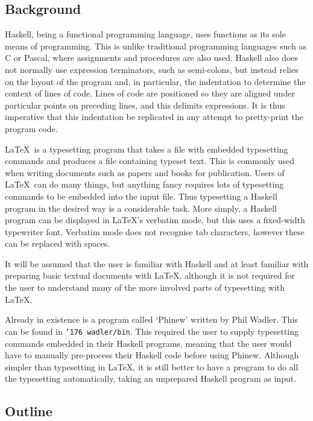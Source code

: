 \subsection*{Background}

Haskell, being a functional programming language, uses functions as its
sole means of programming.  This is unlike traditional programming
languages such as C or Pascal, where assignments and procedures are also used. 
Haskell also does not normally use expression terminators, such as semi-colons, 
but instead relies on the layout of the
program and, in particular, the indentation to determine the context of
lines of code.  Lines of code are positioned so they are aligned under particular
points on preceding lines, and this delimits expressions.  It is thus
imperative that this indentation be replicated in any attempt to pretty-print
the program code.

\LaTeX\ is a typesetting program that takes a file with embedded typesetting
commands and produces a file containing typeset text.  This is commonly used when
writing documents such as papers and books for publication.  Users of \LaTeX\
can do many things, but anything fancy requires lots of typesetting commands to
be embedded into the input file.  Thus typesetting a Haskell program in the
desired way is a considerable task.  More simply, a
Haskell program can be displayed in \LaTeX's verbatim mode, but this uses a fixed-width
typewriter font.  Verbatim mode does not recognise tab characters, however these can be
replaced with spaces.

It will be assumed that the user is familiar with Haskell and at least familiar with
preparing basic textual documents with \LaTeX, although it is not required for the
user to understand many of the more involved parts of typesetting with \LaTeX.

Already in existence is a program called `Phinew' written by Phil Wadler.
This can be found in {\tt \char'176 wadler/bin}.  This required the user to supply 
typesetting commands embedded in their Haskell programs, meaning that the
user would have to manually pre-process their Haskell code before using
Phinew.  Although simpler
than typesetting in \LaTeX, it is still better to have a program 
to do all the typesetting automatically, taking an unprepared Haskell
program as input.

\subsection*{Outline}

